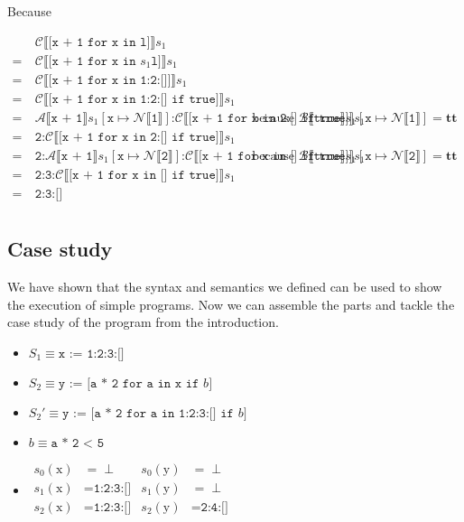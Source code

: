 \documentclass[12pt]{article}
\newcommand\mono\texttt
\newcommand{\dblbr}[1]{\llbracket#1\rrbracket}
\newcommand{\fancybr}[2]{#1 \dblbr{#2}}
\renewcommand{\AA}{\mathcal{A}}
\newcommand{\BB}{\mathcal{B}}
\newcommand{\CC}{\mathcal{C}}
\newcommand{\NN}{\mathcal{N}}
\begin{document}
Because

$\begin{aligned}
    & \fancybr{\CC}{\mono{[x + 1 for x in l]}} s_1\\
    =\ & \fancybr{\CC}{\mono{[x + 1 for x in } s_1 \mono{l]}} s_1\\
    =\ & \fancybr{\CC}{\mono{[x + 1 for x in 1:2:[]]}} s_1\\
    =\ & \fancybr{\CC}{\mono{[x + 1 for x in 1:2:[] if true]}} s_1\\
    =\ & \fancybr{\AA}{\mono{x + 1}} s_1[\mono{x} \mapsto \fancybr{\NN}{\mono{1}}] \mono{:} \fancybr{\CC}{\mono{[x + 1 for x in 2:[] if true]}} s_1
    & \text{because } \fancybr{\BB}{\mono{true}} s_1[\mono{x} \mapsto \fancybr{\NN}{\mono{1}}] = \mathbf{tt}\\
    =\ & \mono{2:} \fancybr{\CC}{\mono{[x + 1 for x in 2:[] if true]}} s_1\\
    =\ & \mono{2:} \fancybr{\AA}{\mono{x + 1}} s_1[\mono{x} \mapsto \fancybr{\NN}{\mono{2}}] \mono{:} \fancybr{\CC}{\mono{[x + 1 for x in [] if true]}} s_1
    & \text{because } \fancybr{\BB}{\mono{true}} s_1[\mono{x} \mapsto \fancybr{\NN}{\mono{2}}] = \mathbf{tt}\\
    =\ & \mono{2:3:} \fancybr{\CC}{\mono{[x + 1 for x in [] if true]}} s_1\\
    =\ & \mono{2:3:[]}\\
\end{aligned}$

\subsection{Case study}

We have shown that the syntax and semantics we defined can be used to show the execution of simple programs. Now we can assemble the parts and tackle the case study of the program from the introduction.

\begin{itemize}
    \item $S_1 \equiv \mono{x := 1:2:3:[]}$
    \item $S_2 \equiv \mono{y := [a * 2 for a in x if } b \mono{]}$
    \item $S_2' \equiv \mono{y := [a * 2 for a in 1:2:3:[] if } b \mono{]}$
    \item $b \equiv \mono{a * 2 < 5}$
    \item $\begin{aligned}
        s_0(\text{x}) &= \perp & s_0(\text{y}) &= \perp\\
        s_1(\text{x}) &= \mono{1:2:3:[]} & s_1(\text{y}) &= \perp\\
        s_2(\text{x}) &= \mono{1:2:3:[]} & s_2(\text{y}) &= \mono{2:4:[]}\\
    \end{aligned}$
\end{itemize}
\end{document}
